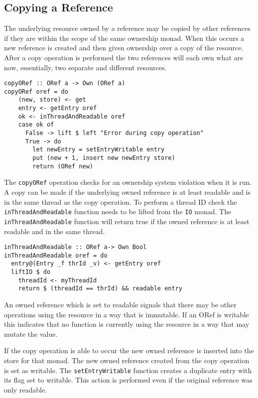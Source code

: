 \documentclass[onehalf,11pt]{beavtex}
\begin{document}
\subsection{Copying a Reference}

The underlying resource owned by a reference may be copied by other references
if they are within the scope of the same ownership monad.  When this occurs a new
reference is created and then given ownership over a copy of the resource.
After a copy operation is performed the two references will each own what are now,
essentially, two separate and different resources.

\begin{verbatim}
copyORef :: ORef a -> Own (ORef a)
copyORef oref = do
    (new, store) <- get
    entry <- getEntry oref
    ok <- inThreadAndReadable oref
    case ok of
      False -> lift $ left "Error during copy operation"
      True -> do
        let newEntry = setEntryWritable entry
        put (new + 1, insert new newEntry store)
        return (ORef new)
\end{verbatim}

The \texttt{copyORef} operation checks for an ownership system violation when
it is run.
A copy can be made if the underlying owned reference is at least readable and
is in the same thread as the copy operation.
To perform a thread ID check the \texttt{inThreadAndReadable} function
needs to be lifted from the \texttt{IO} monad.
The \texttt{inThreadAndReadable} function will return true if the owned reference
is at least readable and in the same thread.

\begin{verbatim}
inThreadAndReadable :: ORef a-> Own Bool
inThreadAndReadable oref = do
  entry@(Entry _f thrId _v) <- getEntry oref
  liftIO $ do
    threadId <- myThreadId
    return $ (threadId == thrId) && readable entry
\end{verbatim}

An owned reference which is set to readable signals that there may be other
operations using the resource in a way that is immutable.
If an ORef is writable this indicates that no function is currently using the
resource in a way that may mutate the value.

If the copy operation is able to occur the new owned reference is inserted into
the store for that monad.  The new owned reference created from the copy
operation is set as writable. The \texttt{setEntryWritable} function
creates a duplicate entry with its flag set to writable.
This action is performed even if the original reference was only
readable.
\end{document}
